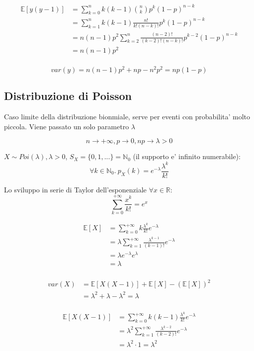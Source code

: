 \begin{align*}
  \mathbb{E}[y(y-1)] &= \sum_{k=0}^{n} k(k-1)\binom{n}{k} p^{k}(1-p)^{n-k} \\
  &= \sum_{k=1}^{n} k(k-1) \frac{n!}{k!(n-k)!} p^{k}(1-p)^{n-k} \\
  &= n(n-1)p^2 \sum_{k=2}^{n} \frac{(n-2)!}{(k-2)!(n-k)!} p^{k-2}(1-p)^{n-k} \\
  &= n(n-1)p^2 \\
\end{align*}

\[
  var(y) = n(n-1)p^2 + np - n^2p^2 = np(1-p)
\]

\subsection{Distribuzione di Poisson}
Caso limite della distribuzione bionmiale, serve per eventi con probabilita' molto piccola. Viene passato un solo parametro $ \lambda $

\[
n\to +\infty, p\to 0, np \to \lambda > 0
\]

$ X \sim Poi(\lambda), \lambda > 0 $, $ S_X = \{0,1,...\} = \mathbb{N}_0 $ (il supporto e' infinito numerabile):
\[
  \forall k \in \mathbb{N}_0.\ p_X(k) = e^{-\lambda}\frac{\lambda^{k}}{k!}
\]

Lo sviluppo in serie di Taylor dell'esponenziale $ \forall x \in \mathbb{R} $: 
\[
\sum_{k=0}^{+\infty} \frac{x^{k}}{k!} = e^{x}
\]

\begin{align*}
  \mathbb{E}[X] &= \sum_{k=0}^{+\infty} k \frac{\lambda^{k}}{k!}e^{-\lambda} \\
  &= \lambda\sum_{k=1}^{+\infty} \frac{\lambda^{k-1}}{(k-1)!}e^{-\lambda} \\
  &= \lambda e^{-\lambda} e^{\lambda} \\
  &= \lambda \\
\end{align*}

\begin{align*}
  var(X) &= \mathbb{E}[X(X-1)] + \mathbb{E}[X] - (\mathbb{E}[X])^2\\
  &= \lambda^2 + \lambda - \lambda^2 = \lambda \\
\end{align*}

\begin{align*}
  \mathbb{E}[X(X-1)] &= \sum_{k=0}^{+\infty} k(k-1) \frac{\lambda^{k}}{k!} e^{-\lambda}\\
  &= \lambda^2 \sum_{k=1}^{+\infty} \frac{\lambda^{k-2}}{(k-2)!}e^{-\lambda} \\
  &= \lambda^2 \cdot 1 = \lambda^2 \\
\end{align*}

